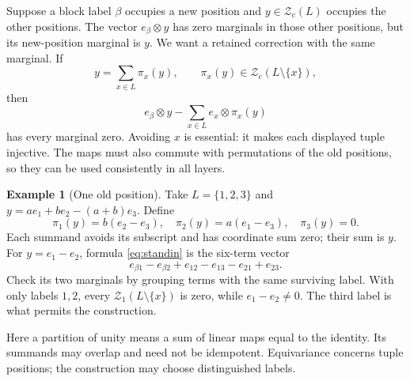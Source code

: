 \documentclass[11pt,a4paper]{article}
\theoremstyle{definition}\newtheorem{definition}[theorem]{Definition}
\newtheorem{example}[theorem]{Example}
\theoremstyle{remark}\newtheorem{remark}[theorem]{Remark}
\begin{document}
Suppose a block label $\beta$ occupies a new position and $y\in \mathcal Z_c(L)$ occupies the other positions. The vector $e_\beta\otimes y$ has zero marginals in those other positions, but its new-position marginal is $y$. We want a retained correction with the same marginal. If
\[y=\sum_{x\in L}\pi_x(y),\qquad \pi_x(y)\in \mathcal Z_c(L\setminus\{x\}),
\]
then
\begin{equation}\label{eq:standin}
e_\beta\otimes y-\sum_{x\in L}e_x\otimes\pi_x(y)
\end{equation}
has every marginal zero. Avoiding $x$ is essential: it makes each displayed tuple injective. The maps must also commute with permutations of the old positions, so they can be used consistently in all layers.

\begin{example}[One old position]
Take $L=\{1,2,3\}$ and $y=a e_1+b e_2-(a+b)e_3$. Define
\[\pi_1(y)=b(e_2-e_3),\quad \pi_2(y)=a(e_1-e_3),\quad\pi_3(y)=0.
\]
Each summand avoids its subscript and has coordinate sum zero; their sum is $y$. For $y=e_1-e_2$, formula \eqref{eq:standin} is the six-term vector
\[e_{\beta1}-e_{\beta2}+e_{12}-e_{13}-e_{21}+e_{23}.
\]
Check its two marginals by grouping terms with the same surviving label. With only labels $1,2$, every $\mathcal Z_1(L\setminus\{x\})$ is zero, while $e_1-e_2\ne0$. The third label is what permits the construction.
\end{example}

Here a partition of unity means a sum of linear maps equal to the
identity. Its summands may overlap and need not be idempotent.
Equivariance concerns tuple positions; the construction may choose
distinguished labels.
\end{document}
